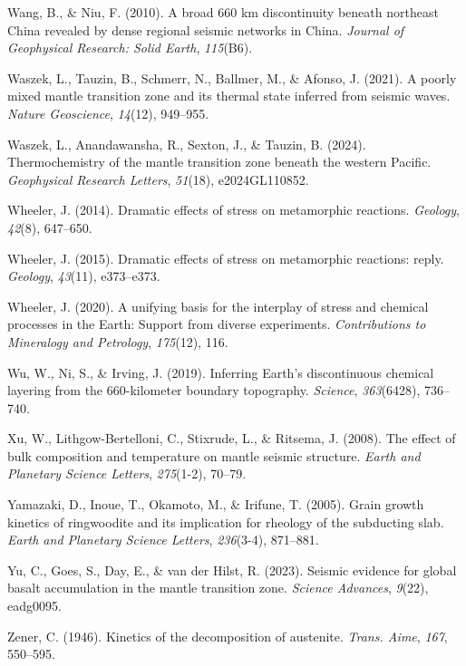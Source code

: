 \documentclass[draft,linenumbers]{agujournal2019}
\newlength{\cslhangindent}
\newenvironment{CSLReferences}[2]
 {\begin{list}{}{
  \setlength{\itemindent}{0pt}
  \setlength{\leftmargin}{0pt}
  \setlength{\parsep}{0pt}
  \ifodd #1
   \setlength{\leftmargin}{\cslhangindent}
   \setlength{\itemindent}{-\cslhangindent}
  \fi
  \setlength{\itemsep}{#2\baselineskip}
  }
  \item\relax}
 {\end{list}}
\begin{document}
\begin{CSLReferences}{1}{0}
Wang, B., \& Niu, F. (2010). A broad 660 km discontinuity beneath
northeast {China} revealed by dense regional seismic networks in
{China}. \emph{Journal of Geophysical Research: Solid Earth},
\emph{115}(B6).

Waszek, L., Tauzin, B., Schmerr, N., Ballmer, M., \& Afonso, J. (2021).
A poorly mixed mantle transition zone and its thermal state inferred
from seismic waves. \emph{Nature Geoscience}, \emph{14}(12), 949--955.

Waszek, L., Anandawansha, R., Sexton, J., \& Tauzin, B. (2024).
Thermochemistry of the mantle transition zone beneath the western
{Pacific}. \emph{Geophysical Research Letters}, \emph{51}(18),
e2024GL110852.

Wheeler, J. (2014). Dramatic effects of stress on metamorphic reactions.
\emph{Geology}, \emph{42}(8), 647--650.

Wheeler, J. (2015). Dramatic effects of stress on metamorphic reactions:
reply. \emph{Geology}, \emph{43}(11), e373--e373.

Wheeler, J. (2020). A unifying basis for the interplay of stress and
chemical processes in the {Earth}: Support from diverse experiments.
\emph{Contributions to Mineralogy and Petrology}, \emph{175}(12), 116.

Wu, W., Ni, S., \& Irving, J. (2019). Inferring {Earth}'s discontinuous
chemical layering from the 660-kilometer boundary topography.
\emph{Science}, \emph{363}(6428), 736--740.

Xu, W., Lithgow-Bertelloni, C., Stixrude, L., \& Ritsema, J. (2008). The
effect of bulk composition and temperature on mantle seismic structure.
\emph{Earth and Planetary Science Letters}, \emph{275}(1-2), 70--79.

Yamazaki, D., Inoue, T., Okamoto, M., \& Irifune, T. (2005). Grain
growth kinetics of ringwoodite and its implication for rheology of the
subducting slab. \emph{Earth and Planetary Science Letters},
\emph{236}(3-4), 871--881.

{Yu, C., Goes, S., Day, E., \& van der Hilst, R.} (2023). Seismic
evidence for global basalt accumulation in the mantle transition zone.
\emph{Science Advances}, \emph{9}(22), eadg0095.

Zener, C. (1946). Kinetics of the decomposition of austenite.
\emph{Trans. Aime}, \emph{167}, 550--595.

\end{CSLReferences}
\end{document}
